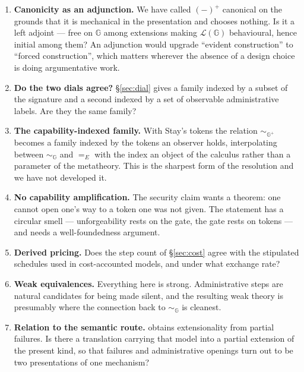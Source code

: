 \documentclass[11pt]{article}
\theoremstyle{plain}
\theoremstyle{definition}
\newcommand{\Gg}{\mathbb{G}}
\newcommand{\Lo}{\mathcal{L}}
\newcommand{\bis}{\sim}
\begin{document}
\begin{enumerate}
\item \textbf{Canonicity as an adjunction.} We have called $(-)^+$ canonical on the grounds that it is
mechanical in the presentation and chooses nothing. Is it a left adjoint --- free on $\Gg$ among
extensions making $\Lo(\Gg)$ behavioural, hence initial among them? An adjunction would upgrade
``evident construction'' to ``forced construction'', which matters wherever the absence of a design
choice is doing argumentative work.

\item \textbf{Do the two dials agree?} \S\ref{sec:dial} gives a family indexed by a subset of the
signature and a second indexed by a set of observable administrative labels. Are they the same family?

\item \textbf{The capability-indexed family.} With Stay's tokens the relation $\bis_{\Gg^+}$ becomes a
family indexed by the tokens an observer holds, interpolating between $\bis_\Gg$ and $=_E$ with the
index an object of the calculus rather than a parameter of the metatheory. This is the sharpest form
of the resolution and we have not developed it.

\item \textbf{No capability amplification.} The security claim wants a theorem: one cannot open one's
way to a token one was not given. The statement has a circular smell --- unforgeability rests on the
gate, the gate rests on tokens --- and needs a well-foundedness argument.

\item \textbf{Derived pricing.} Does the step count of \S\ref{sec:cost} agree with the stipulated
schedules used in cost-accounted models, and under what exchange rate?

\item \textbf{Weak equivalences.} Everything here is strong. Administrative steps are natural
candidates for being made silent, and the resulting weak theory is presumably where the connection back
to $\bis_\Gg$ is cleanest.

\item \textbf{Relation to the semantic route.} \cite{CairesVieira} obtains extensionality from partial
failures. Is there a translation carrying that model into a partial extension of the present kind, so
that failures and administrative openings turn out to be two presentations of one mechanism?
\end{enumerate}
\end{document}
